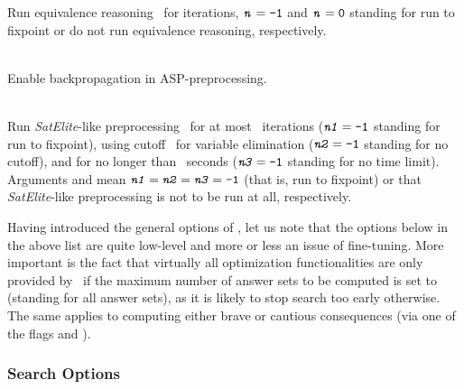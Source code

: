 \begin{description}
Run equivalence reasoning~\cite{gekanesc08a} for  iterations,
$\texttt{\textit{n}}=\texttt{-1}$ and $\texttt{\textit{n}}=\texttt{0}$ standing for
run to fixpoint or do not run equivalence reasoning, respectively.
\item[\code{--backprop}]~\\
Enable backpropagation in ASP-preprocessing.
\item[\code{--sat-prepro=yes|no|\textit{n1}[,\textit{n2},\textit{n3}]}]~\\
Run \emph{SatElite}-like preprocessing~\cite{eenbie05a}
for at most~ iterations 
($\texttt{\textit{n1}}=\texttt{-1}$ standing for run to fixpoint),
using cutoff~ for variable elimination
($\texttt{\textit{n2}}=\texttt{-1}$ standing for no cutoff), and
for no longer than~ seconds
($\texttt{\textit{n3}}=\texttt{-1}$ standing for no time limit).
Arguments  and  mean
$\texttt{\textit{n1}}=\texttt{\textit{n2}}=\texttt{\textit{n3}}=\texttt{-1}$
(that is, run to fixpoint)
or that \emph{SatElite}-like preprocessing is not to be run at all, respectively.
\end{description}
%
Having introduced the general options of \clasp,
let us note that the options below  in the above list
are quite low-level and more or less an issue of fine-tuning.
More important is the fact that virtually all optimization functionalities
are only provided by \clasp\ if the maximum number of answer sets to be
computed is set to~ (standing for all answer sets),
as it is likely to stop search too early otherwise.
The same applies to computing either brave or cautious consequences
(via one of the flags  and ).


\subsubsection{Search Options}\label{subsec:clasp:search}

